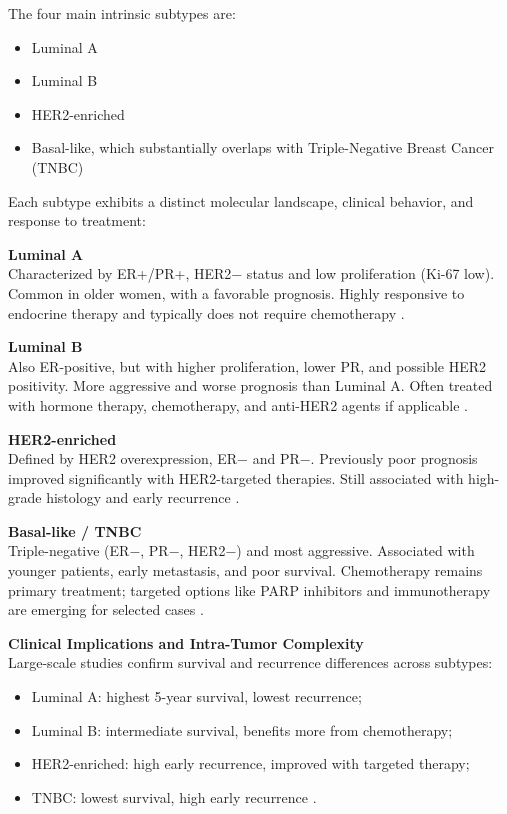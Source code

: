 The four main intrinsic subtypes are:
\begin{itemize}
    \item Luminal A
    \item Luminal B
    \item HER2-enriched
    \item Basal-like, which substantially overlaps with Triple-Negative Breast Cancer (TNBC)
\end{itemize}

Each subtype exhibits a distinct molecular landscape, clinical behavior, and response to treatment:

\textbf{Luminal A} \\
Characterized by ER+/PR+, HER2− status and low proliferation (Ki-67 low). Common in older women, with a favorable prognosis. Highly responsive to endocrine therapy and typically does not require chemotherapy \textcite{clinical_implication_bca_Adamo2015,diff_bca_usa_Howlader2018}.

\textbf{Luminal B} \\
Also ER-positive, but with higher proliferation, lower PR, and possible HER2 positivity. More aggressive and worse prognosis than Luminal A. Often treated with hormone therapy, chemotherapy, and anti-HER2 agents if applicable \textcite{bc_subtypes_Prat2015Clinical,updatedbca_Hong2022Breast}.

\textbf{HER2-enriched} \\
Defined by HER2 overexpression, ER− and PR−. Previously poor prognosis improved significantly with HER2-targeted therapies. Still associated with high-grade histology and early recurrence \textcite{clinical_implication_bca_Adamo2015,bc_subtypes_Prat2015Clinical}.

\textbf{Basal-like / TNBC} \\
Triple-negative (ER−, PR−, HER2−) and most aggressive. Associated with younger patients, early metastasis, and poor survival. Chemotherapy remains primary treatment; targeted options like PARP inhibitors and immunotherapy are emerging for selected cases \textcite{review_tnbc_Hubalek2017,tnbc_landscape_Naorem2018}.

\textbf{Clinical Implications and Intra-Tumor Complexity} \\
Large-scale studies confirm survival and recurrence differences across subtypes:
\begin{itemize}
    \item Luminal A: highest 5-year survival, lowest recurrence;
    \item Luminal B: intermediate survival, benefits more from chemotherapy;
    \item HER2-enriched: high early recurrence, improved with targeted therapy;
    \item TNBC: lowest survival, high early recurrence \textcite{diff_bca_usa_Howlader2018,bc_subtypes_Prat2015Clinical}.
\end{itemize}

